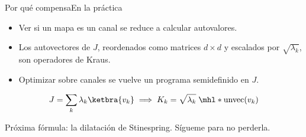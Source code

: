 \documentclass[12pt]{beamer}
\begin{document}
\begin{frame}{Por qué compensa}{En la práctica}
\begin{itemize}
  \item Ver si un mapa es un canal se reduce a calcular autovalores.
  \item Los autovectores de $J$, reordenados como matrices $d\times d$ y
        escalados por $\sqrt{\lambda_k}$, son operadores de Kraus.
  \item Optimizar sobre canales se vuelve un programa semidefinido en $J$.
\end{itemize}
\[
  J = \sum_k \lambda_k \ketbra{v_k}
  \;\Longrightarrow\;
  K_k = \sqrt{\lambda_k}\;\mhl*{\operatorname{unvec}(v_k)}
\]
\end{frame}

  {Próxima fórmula: la dilatación de Stinespring. Sígueme para no perderla.}
\end{document}
